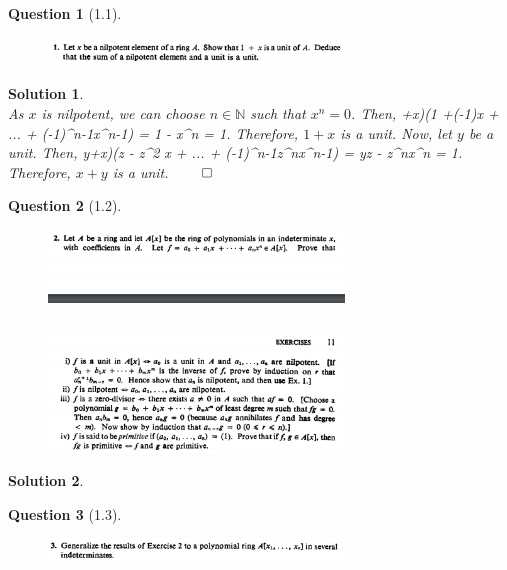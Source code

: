 \documentclass[11pt]{article}
\theoremstyle{plain}
\def\eQb#1\eQe{\begin{eqnarray*}#1\end{eqnarray*}}
\theoremstyle{quest}
\newtheorem*{question}{Question}
\newtheorem*{solution}{Solution}
\begin{document}
\begin{question}[1.1]
\hfill
\begin{figure}[h!]
  \centering
    \includegraphics[width=0.7\textwidth]{d-1-1.png}
\end{figure}
\end{question}
\begin{solution} \hfill \\
As $x$ is nilpotent, we can choose $n \in \mathbb{N}$ such that $x^n = 0$.
Then,
\eQb
(1+x)(1 +(-1)x + ... + (-1)^{n-1}x^{n-1}) = 1 - x^{n} = 1.
\eQe
Therefore, $1+x$ is a unit. Now, let $y$ be a unit. Then, 
\eQb
(y+x)(z - z^2 x + ... + (-1)^{n-1}z^{n}x^{n-1}) = yz - z^{n}x^{n} = 1.
\eQe
Therefore, $x+y$ is a unit. \hfill $\qed$

\end{solution}
\begin{question}[1.2]
\hfill
\begin{figure}[h!]
  \centering
    \includegraphics[width=0.7\textwidth]{d-1-2.png}
\end{figure}
\end{question}
\begin{solution} \hfill \\


\end{solution}
\begin{question}[1.3]
\hfill
\begin{figure}[h!]
  \centering
    \includegraphics[width=0.7\textwidth]{d-1-3.png}
\end{figure}
\end{question}
\end{document}
